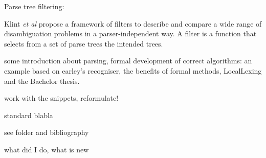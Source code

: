 \begin{isabellebody}
\begin{isamarkuptext}
Parse tree filtering:

Klint \textit{et al} \cite{Klint:1997} propose a framework of filters to describe and compare a wide
range of disambiguation problems in a parser-independent way. A filter is a function that selects
from a set of parse trees the intended trees.%
\end{isamarkuptext}\isamarkuptrue%
%
\isadelimdocument
%
\endisadelimdocument
%
\isatagdocument
%
\isamarkuptrue%
%
\isamarkuptrue%
%
\endisatagdocument
{\isafolddocument}%
%
\isadelimdocument
%
\endisadelimdocument
%
\begin{isamarkuptext}%
some introduction about parsing, formal development of correct algorithms: an example based on
earley's recogniser, the benefits of formal methods, LocalLexing and the Bachelor thesis.%
\end{isamarkuptext}\isamarkuptrue%
%
\begin{isamarkuptext}%
work with the snippets, reformulate!%
\end{isamarkuptext}\isamarkuptrue%
%
\isadelimdocument
%
\endisadelimdocument
%
\isatagdocument
%
\isamarkuptrue%
%
\endisatagdocument
{\isafolddocument}%
%
\isadelimdocument
%
\endisadelimdocument
%
\begin{isamarkuptext}%
standard blabla%
\end{isamarkuptext}\isamarkuptrue%
%
\isadelimdocument
%
\endisadelimdocument
%
\isatagdocument
%
\isamarkuptrue%
%
\endisatagdocument
{\isafolddocument}%
%
\isadelimdocument
%
\endisadelimdocument
%
\begin{isamarkuptext}%
see folder and bibliography%
\end{isamarkuptext}\isamarkuptrue%
%
\isadelimdocument
%
\endisadelimdocument
%
\isatagdocument
%
\isamarkuptrue%
%
\endisatagdocument
{\isafolddocument}%
%
\isadelimdocument
%
\endisadelimdocument
%
\begin{isamarkuptext}%
what did I do, what is new%
\end{isamarkuptext}\isamarkuptrue%
%
\isadelimtheory
%
\endisadelimtheory
%
\isatagtheory
%
\endisatagtheory
{\isafoldtheory}%
%
\isadelimtheory
%
\endisadelimtheory
%
\end{isabellebody}%
\endinput
